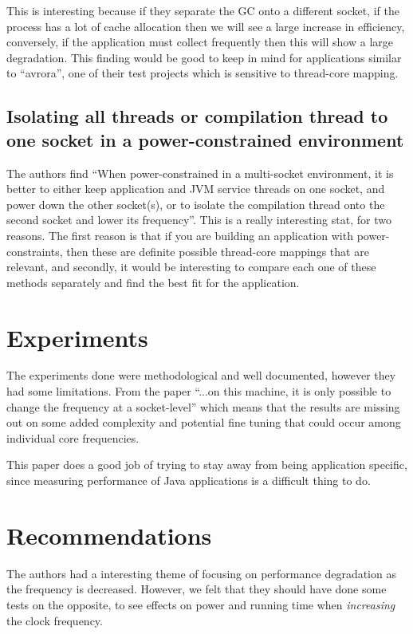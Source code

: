\documentclass[conference]{IEEEtran}
\begin{document}
This is interesting because if they separate the GC onto a different socket, if the process has a lot of cache allocation then we will see a large increase in efficiency, conversely, if the application must collect frequently then this will show a large degradation.  This finding would be good to keep in mind for applications similar to ``avrora'', one of their test projects which is sensitive to thread-core mapping.

\subsection{Isolating all threads or compilation thread to one socket in a power-constrained environment}

The authors find ``When power-constrained in a multi-socket environment, it is better to either keep application and JVM service threads on one socket, and power down the other socket(s), or to isolate the compilation thread onto the second socket and lower its frequency''. This is a really interesting stat, for two reasons.  The first reason is that if you are building an application with power-constraints, then these are definite possible thread-core mappings that are relevant, and secondly, it would be interesting to compare each one of these methods separately and find the best fit for the application.  

\section{Experiments}

The experiments done were methodological and well documented, however they had some limitations.  From the paper ``...on this machine, it is only possible to change the frequency at a socket-level'' which means that the results are missing out on some added complexity and potential fine tuning that could occur among individual core frequencies.

This paper does a good job of trying to stay away from being application specific, since measuring performance of Java applications is a difficult thing to do. 

\section{Recommendations}
The authors had a interesting theme of focusing on performance degradation as the frequency is decreased.  However, we felt that they should have done some tests on the opposite, to see effects on power and running time when \emph{increasing} the clock frequency.  
\end{document}
